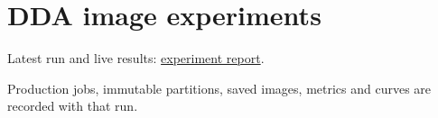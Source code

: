 \section{DDA image
experiments}\label{record-docs-image-reference-reward-results-md-dda-image-experiments}

Latest run and live results:
\href{../results/research_workflow/image_dda/20261025T005139162737Z/report.md}{experiment
report}.

Production jobs, immutable partitions, saved images, metrics and curves
are recorded with that run.
